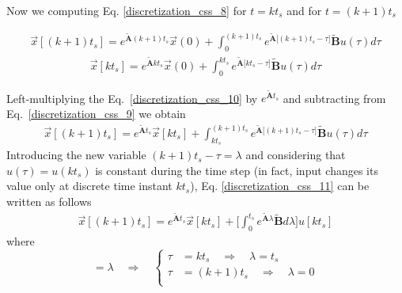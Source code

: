\documentclass[12pt,a4paper,oneside]{book}
\begin{document}
\begin{onehalfspace}
Now we computing Eq. \ref{discretization_css_8} for $t=kt_s$ and for 
$t=(k+1)t_s$
\begin{mybox}
\begin{equation}\label{discretization_css_9}
	\begin{aligned}
		\vec{x}[(k+1)t_s] = e^{\tilde{\mathbf{A}}(k+1)t_s} \vec{x}(0) + \int_{0}^{(k+1)t_s} e^{\tilde{\mathbf{A}}\Big[(k+1)t_s-\tau\Big]} \tilde{\mathbf{B}}u(\tau)d\tau
	\end{aligned}
\end{equation}
\begin{equation}\label{discretization_css_10}
	\begin{aligned}
		\vec{x}[kt_s] = e^{\tilde{\mathbf{A}}kt_s} \vec{x}(0) + \int_{0}^{kt_s}e^{\tilde{\mathbf{A}}\Big[kt_s-\tau\Big]} \tilde{\mathbf{B}}u(\tau)d\tau
	\end{aligned}
\end{equation}
\end{mybox}
Left-multiplying the Eq.~\eqref{discretization_css_10} by 
$e^{\tilde{\mathbf{A}}t_s}$ and subtracting from 
Eq.~\eqref{discretization_css_9} we obtain 
\begin{equation}\label{discretization_css_11}
	\begin{aligned}
		\vec{x}[(k+1)t_s] = e^{\tilde{\mathbf{A}}t_s} \vec{x}[kt_s] + \int_{kt_s}^{(k+1)t_s} e^{\tilde{\mathbf{A}}\Big[(k+1)t_s-\tau\Big]} \tilde{\mathbf{B}}u(\tau)d\tau
	\end{aligned}
\end{equation}
Introducing the new variable $ (k+1)t_s-\tau = \lambda $ and considering that 
$u(\tau) = u(kt_s)$ is constant during the time step (in fact, input changes 
its value only at discrete time instant $kt_s$), Eq. 
\ref{discretization_css_11} can be written as follows
\begin{equation}\label{discretization_css_12}
	\begin{aligned}
		\vec{x}[(k+1)t_s] = e^{\tilde{\mathbf{A}}t_s} \vec{x}[kt_s] + 
		\Bigg[\int_{0}^{t_s}e^{\tilde{\mathbf{A}}\lambda} 
		\tilde{\mathbf{B}}d\lambda\Bigg] u[kt_s]
	\end{aligned}
\end{equation}
where 
\begin{equation}
	[(k+1)t_s-\tau]= \lambda \quad\Rightarrow\quad\left\lbrace 
	\begin{aligned}
		\tau &= kt_s \quad\Rightarrow\quad \lambda = t_s \\[6pt]
		\tau &= (k+1)t_s \quad\Rightarrow\quad \lambda = 0 \\[6pt]

\end{aligned}
\end{equation}
\end{onehalfspace}
\end{document}
